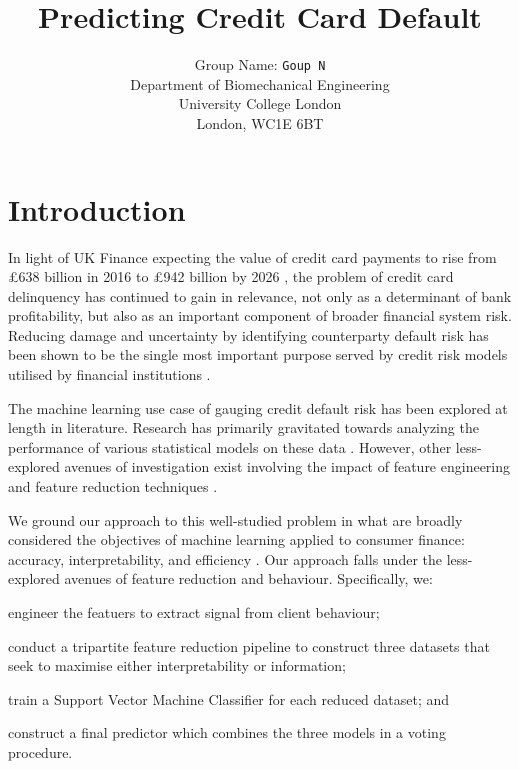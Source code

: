\documentclass{article}
\title{Predicting Credit Card Default}
\author{
 Group Name: \texttt{Goup N}\\
  Department of Biomechanical Engineering\\
  University College London\\
  London, WC1E 6BT\\
}
\begin{document}
\maketitle





\section{Introduction}

In light of UK Finance expecting the value of credit card payments to rise from £638 billion in 2016 to £942 billion by 2026 \cite{ukfinance}, the problem of credit card delinquency has continued to gain in relevance, not only as a determinant of bank profitability, but also as an important component of broader financial system risk. Reducing damage and uncertainty by identifying counterparty default risk has been shown to be the single most important purpose served by credit risk models utilised by financial institutions \cite{hsu2019enhanced, fatemi2006credit}.


The machine learning use case of gauging credit default risk has been explored at length in literature. Research has primarily gravitated towards analyzing the performance of various statistical models on these data \citep{rosenberg1994quantitative, giudici2001bayesian, lee2002credit, baesens2003benchmarking}. However, other less-explored avenues of investigation exist involving the impact of feature engineering \citep{kamil2014examining, lu2017real, agarwal2010importance} and feature reduction techniques \citep{hu2019feature, mbuvha2019bayesian, piramuthu2004evaluating}. 

We ground our approach to this well-studied problem in what are broadly considered the objectives of machine learning applied to consumer finance: accuracy, interpretability, and efficiency \citep{hand1997statistical}. Our approach falls under the less-explored avenues of feature reduction and behaviour. Specifically, we:
\begin{enumerate*}[label=(\roman*)]
	\item engineer the featuers to extract signal from client behaviour; 
	\item conduct a tripartite feature reduction pipeline to construct three datasets that seek to maximise either interpretability or information;
	\item train a Support Vector Machine Classifier for each reduced dataset; and
	\item construct a final predictor which combines the three models in a voting procedure. 
\end{enumerate*}
\end{document}

